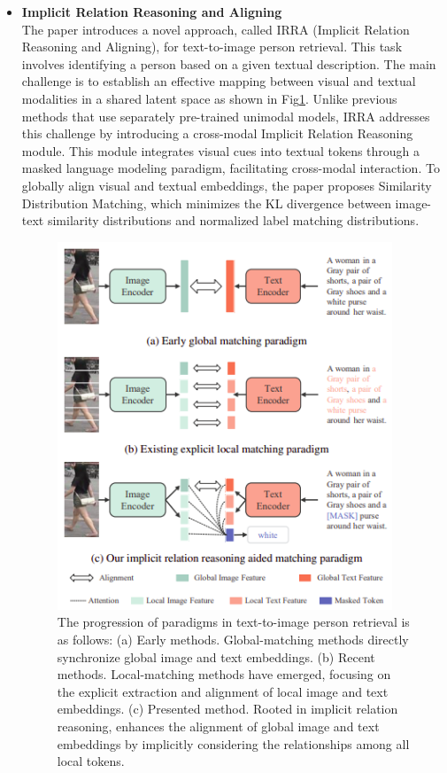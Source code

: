 \begin{itemize}
    \item \textbf{Implicit Relation Reasoning and Aligning}\\
    The paper introduces a novel approach, called IRRA (Implicit Relation Reasoning and Aligning), for text-to-image person retrieval. This task involves identifying a person based on a given textual description. The main challenge is to establish an effective mapping between visual and textual modalities in a shared latent space as shown in Fig\ref{fig:irra}. Unlike previous methods that use separately pre-trained unimodal models, IRRA addresses this challenge by introducing a cross-modal Implicit Relation Reasoning module. This module integrates visual cues into textual tokens through a masked language modeling paradigm, facilitating cross-modal interaction. To globally align visual and textual embeddings, the paper proposes Similarity Distribution Matching, which minimizes the KL divergence between image-text similarity distributions and normalized label matching distributions. 
    \begin{figure}[htbp]
        \begin{center}
            \includegraphics[width=10cm]{img/irra.png}
            \caption[short]{The progression of paradigms in text-to-image person retrieval is as follows: (a) Early methods. Global-matching methods directly synchronize global image and text embeddings. (b) Recent methods. Local-matching methods have emerged, focusing on the explicit extraction and alignment of local image and text embeddings. (c) Presented method. Rooted in implicit relation reasoning, enhances the alignment of global image and text embeddings by implicitly considering the relationships among all local tokens.}\label{fig:irra}
        \end{center}
    \end{figure}


\end{itemize}
